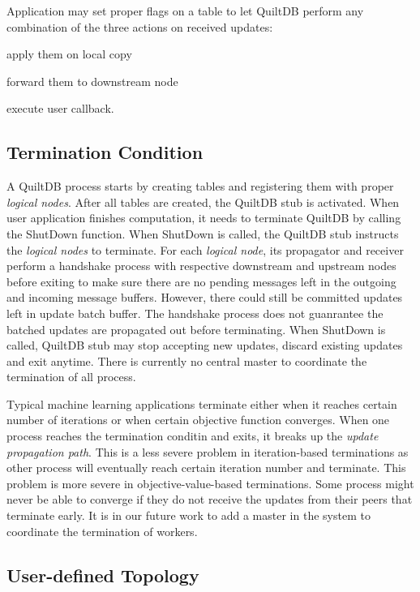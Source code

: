 \documentclass[11pt, twocolumn]{article}
\begin{document}
Application may set proper flags on a table to let QuiltDB perform any
combination of the three actions on received updates:
\begin{enumerate*}
\item apply them on local copy
\item forward them to downstream node
\item execute user callback.
\end{enumerate*}

\subsection{Termination Condition}

A QuiltDB process starts by creating tables and registering them with proper 
\emph{logical nodes}. After all tables are created, the QuiltDB stub is 
activated. When user application finishes computation, it needs to 
terminate QuiltDB by calling the ShutDown function. When ShutDown is called, the
QuiltDB stub instructs the \emph{logical nodes} to terminate. For each 
\emph{logical node}, its propagator and receiver perform a handshake process 
with respective downstream and upstream nodes before exiting to make sure 
there are no pending messages left in the outgoing and incoming message buffers.
However, there could still be committed updates left in update batch buffer. The
 handshake process does not guanrantee the batched updates are propagated out 
before terminating. When ShutDown is called, QuiltDB stub may stop accepting new
updates, discard existing updates and exit anytime. There is currently no 
central master to coordinate the termination of all process.

Typical machine learning applications terminate either when it reaches certain 
number of iterations or when certain objective function converges. When one
process reaches the termination conditin and exits, it breaks up the \emph{update
propagation path}. This is a less severe problem in iteration-based terminations
as other process will eventually reach certain iteration number and terminate. 
This problem is more severe in objective-value-based terminations. Some 
process might never be able to converge if they do not receive the updates from 
their peers that terminate early. It is in our future work to add a master in 
the system to coordinate the termination of workers.

\subsection{User-defined Topology}
\end{document}
